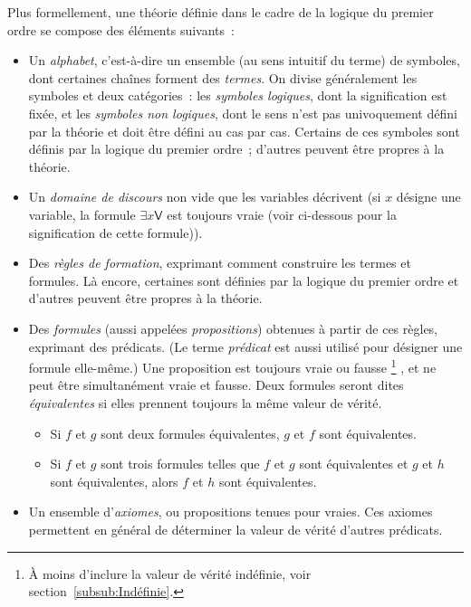 Plus formellement, une théorie définie dans le cadre de la logique du premier ordre se compose des éléments suivants : 
\begin{itemize}[nosep]
    \item Un \textit{alphabet}, c'est-à-dire un ensemble (au sens intuitif du terme) de symboles, dont certaines chaînes forment des \textit{termes}. 
          On divise généralement les symboles et deux catégories : les \textit{symboles logiques}, dont la signification est fixée, et les \textit{symboles non logiques}, dont le sens n'est pas univoquement défini par la théorie et doit être défini au cas par cas. 
          Certains de ces symboles sont définis par la logique du premier ordre ; d'autres peuvent être propres à la théorie. 
    \item Un \textit{domaine de discours} non vide que les variables décrivent (si $x$ désigne une variable, la formule $\exists x \mathsf{V}$ est toujours vraie (voir ci-dessous pour la signification de cette formule)).
    \item Des \textit{règles de formation}, exprimant comment construire les termes et formules. 
          Là encore, certaines sont définies par la logique du premier ordre et d'autres peuvent être propres à la théorie.
    \item Des \textit{formules} (aussi appelées \textit{propositions}) obtenues à partir de ces règles, exprimant des prédicats. 
        (Le terme \textit{prédicat} est aussi utilisé pour désigner une formule elle-même.)
        Une proposition est toujours vraie ou fausse%
        \footnote{ À moins d'inclure la valeur de vérité indéfinie, voir section~\ref{subsub:Indéfinie}.}%
        , et ne peut être simultanément vraie et fausse. 
        Deux formules seront dites \textit{équivalentes} si elles prennent toujours la même valeur de vérité. 
        \begin{itemize}[nosep]
            \item Si $f$ et $g$ sont deux formules équivalentes, $g$ et $f$ sont équivalentes.
            \item Si $f$ et $g$ sont trois formules telles que $f$ et $g$ sont équivalentes et $g$ et $h$ sont équivalentes, alors $f$ et $h$ sont équivalentes.
        \end{itemize}
    \item Un ensemble d'\textit{axiomes}, ou propositions tenues pour vraies. 
          Ces axiomes permettent en général de déterminer la valeur de vérité d'autres prédicats.
\end{itemize}

